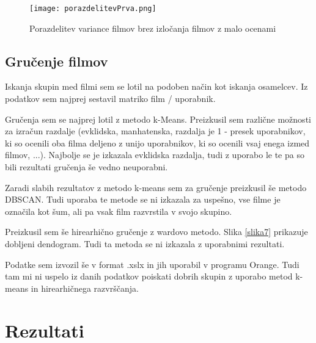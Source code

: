 \documentclass[a4paper,11pt]{article}
\begin{document}
\begin{figure}[htbp]
\begin{center}
\texttt{[image: porazdelitevPrva.png]}
\caption{Porazdelitev variance filmov brez izločanja filmov z malo ocenami}
\label{slika1}
\end{center}
\end{figure}

\subsection{Gručenje filmov}
Iskanja skupin med filmi sem se lotil na podoben način kot iskanja osamelcev. Iz podatkov sem najprej sestavil matriko
film / uporabnik.

Gručenja sem se najprej lotil z metodo k-Means. Preizkusil sem različne možnosti za izračun razdalje (evklidska, manhatenska, razdalja je 1 - presek uporabnikov, ki so ocenili oba filma deljeno z unijo uporabnikov, ki so ocenili vsaj enega izmed filmov, ...). Najbolje se je izkazala evklidska razdalja, tudi z uporabo le te pa so bili rezultati gručenja še vedno neuporabni.

Zaradi slabih rezultatov z metodo k-means sem za gručenje preizkusil še metodo DBSCAN. Tudi uporaba te metode se ni izkazala za uspešno, vse filme je označila kot šum, ali pa vsak film razvrstila v svojo skupino.

Preizkusil sem še hirearhično gručenje z wardovo metodo. Slika \ref{slika7} prikazuje dobljeni dendogram. Tudi ta metoda se ni izkazala z uporabnimi rezultati.

Podatke sem izvozil še v format .xslx in jih uporabil v programu Orange. Tudi tam mi ni uspelo iz danih podatkov poiskati dobrih skupin z uporabo metod k-means in hirearhičnega razvrščanja.

\section{Rezultati}


\end{document}
